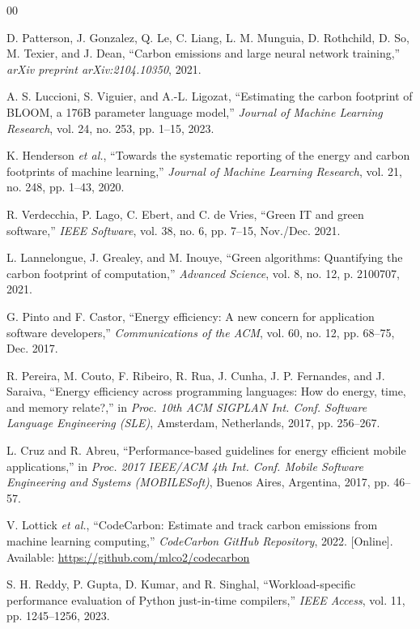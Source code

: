 \documentclass[conference]{IEEEtran}
\begin{document}
\begin{thebibliography}{00}

D. Patterson, J. Gonzalez, Q. Le, C. Liang, L. M. Munguia, D. Rothchild,
D. So, M. Texier, and J. Dean, ``Carbon emissions and large neural network
training,'' \textit{arXiv preprint arXiv:2104.10350}, 2021.

A. S. Luccioni, S. Viguier, and A.-L. Ligozat, ``Estimating the carbon
footprint of BLOOM, a 176B parameter language model,'' \textit{Journal of
Machine Learning Research}, vol. 24, no. 253, pp. 1--15, 2023.

K. Henderson \textit{et al.}, ``Towards the systematic reporting of the
energy and carbon footprints of machine learning,'' \textit{Journal of
Machine Learning Research}, vol. 21, no. 248, pp. 1--43, 2020.

R. Verdecchia, P. Lago, C. Ebert, and C. de Vries, ``Green IT and green
software,'' \textit{IEEE Software}, vol. 38, no. 6, pp. 7--15, Nov./Dec. 2021.

L. Lannelongue, J. Grealey, and M. Inouye, ``Green algorithms: Quantifying
the carbon footprint of computation,'' \textit{Advanced Science}, vol. 8,
no. 12, p. 2100707, 2021.

G. Pinto and F. Castor, ``Energy efficiency: A new concern for application
software developers,'' \textit{Communications of the ACM}, vol. 60, no. 12,
pp. 68--75, Dec. 2017.

R. Pereira, M. Couto, F. Ribeiro, R. Rua, J. Cunha, J. P. Fernandes, and
J. Saraiva, ``Energy efficiency across programming languages: How do energy,
time, and memory relate?,'' in \textit{Proc. 10th ACM SIGPLAN Int. Conf.
Software Language Engineering (SLE)}, Amsterdam, Netherlands, 2017,
pp. 256--267.

L. Cruz and R. Abreu, ``Performance-based guidelines for energy efficient
mobile applications,'' in \textit{Proc. 2017 IEEE/ACM 4th Int. Conf. Mobile
Software Engineering and Systems (MOBILESoft)}, Buenos Aires, Argentina, 2017,
pp. 46--57.

V. Lottick \textit{et al.}, ``CodeCarbon: Estimate and track carbon emissions
from machine learning computing,'' \textit{CodeCarbon GitHub Repository}, 2022.
[Online]. Available: \url{https://github.com/mlco2/codecarbon}

S. H. Reddy, P. Gupta, D. Kumar, and R. Singhal, ``Workload-specific
performance evaluation of Python just-in-time compilers,'' \textit{IEEE
Access}, vol. 11, pp. 1245--1256, 2023.


\end{thebibliography}
\end{document}
